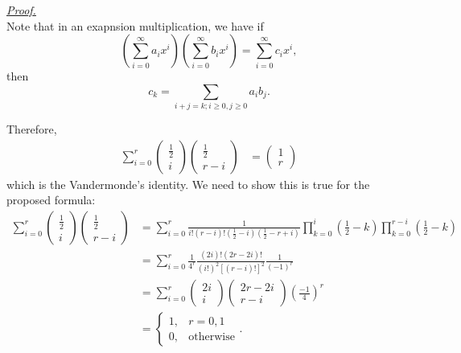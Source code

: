 \documentclass[12pt]{article}
\renewenvironment{proof}[1][Proof]{\begin{snugshade*} \underline{\textit{{#1}.}}\\}{\hfill \qedsymbol \end{snugshade*}}
\begin{document}
    \begin{proof}
        Note that in an exapnsion multiplication, we have if \[(\sum_{i=0}^{\infty}a_i x^i)(\sum_{i=0}^{\infty}b_i x^i)=\sum_{i=0}^{\infty}c_i x^i,\] then \[c_k=\sum_{i+j=k;i\geq 0,j\geq 0}a_i b_j.\]

        Therefore, \begin{align*}
            \sum_{i=0}^r\begin{pmatrix}
                \frac{1}{2}\\i
            \end{pmatrix}\begin{pmatrix}
                \frac{1}{2}\\r-i
            \end{pmatrix}&=\begin{pmatrix}
                1\\r
            \end{pmatrix}
        \end{align*}
        which is the Vandermonde's identity. We need to show this is true for the proposed formula: \begin{align*}
            \sum_{i=0}^r\begin{pmatrix}
                \frac{1}{2}\\i
            \end{pmatrix}\begin{pmatrix}
                \frac{1}{2}\\r-i
            \end{pmatrix}&=\sum_{i=0}^{r}\frac{1}{i!(r-i)!(\frac{1}{2}-i)(\frac{1}{2}-r+i)}\prod_{k=0}^{i}(\frac{1}{2}-k)\prod_{k=0}^{r-i}(\frac{1}{2}-k)\\
            &=\sum_{i=0}^{r}\frac{1}{4^r}\frac{(2i)!(2r-2i)!}{(i!)^2[(r-i)!]^2}\frac{1}{(-1)^r}\\
            &=\sum_{i=0}^{r}\begin{pmatrix}
                2i\\i
            \end{pmatrix}\begin{pmatrix}
                2r-2i\\r-i
            \end{pmatrix}(\frac{-1}{4})^r\\
            &=\begin{cases}
                1,&r=0,1\\
                0,&\textrm{otherwise}
            \end{cases}.
        \end{align*}
    \end{proof}
\end{document}
